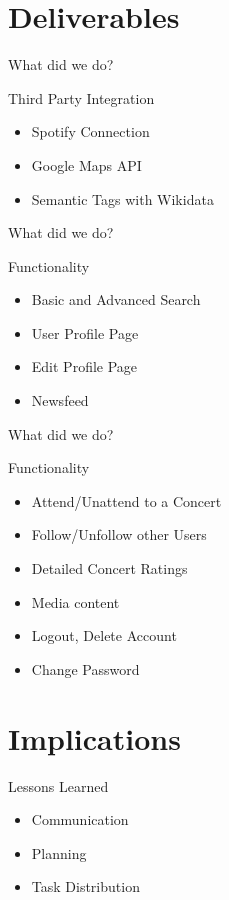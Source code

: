 \documentclass{beamer}
\begin{document}
\section{Deliverables}

\begin{frame}{What did we do?}
	\begin{block}{Third Party Integration}
		\begin{itemize}
			\item[\Checkmark] Spotify Connection
			\item[\Checkmark] Google Maps API
			\item[\Checkmark] Semantic Tags with Wikidata		
		\end{itemize}
	\end{block}
\end{frame}

\begin{frame}{What did we do?}	
	\begin{block}{Functionality}
		\begin{itemize}
			\item[\Checkmark] 	Basic and Advanced Search
			\item[\Checkmark] 	User Profile Page
			\item[\XSolidBrush] Edit Profile Page
			\item[\Checkmark] 	Newsfeed
		\end{itemize}
	\end{block}
\end{frame}

\begin{frame}{What did we do?}	
	\begin{block}{Functionality}
		\begin{itemize}
			\item[\Checkmark] Attend/Unattend to a Concert
			\item[\Checkmark] Follow/Unfollow other Users
			\item[\Checkmark] Detailed Concert Ratings
			\item[\Checkmark] Media content
			\item[\Checkmark] Logout, Delete Account
			\item[\XSolidBrush] Change Password
		\end{itemize}
	\end{block}
\end{frame}

\section{Implications}
\begin{frame}
  {Lessons Learned}

  \begin{itemize}
  \item Communication
  \item Planning
  \item Task Distribution
    
  \end{itemize}
\end{frame}
\end{document}
